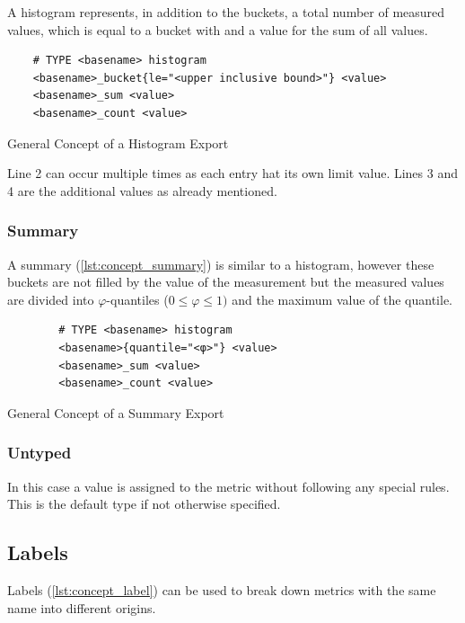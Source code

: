 A histogram represents, in addition to the buckets, a total number of measured values, which is equal to a bucket with  and a value for the sum of all values.

\begin{listing}[!ht]
	\begin{verbatim}
	# TYPE <basename> histogram
	<basename>_bucket{le="<upper inclusive bound>"} <value>
	<basename>_sum <value>
	<basename>_count <value>
	\end{verbatim}
	\caption{General Concept of a Histogram Export}
	\label{lst:concept_histogramm}
\end{listing}

Line 2 can occur multiple times as each entry hat its own limit value. Lines 3 and 4 are the additional values as already mentioned.

\subsubsection{Summary}

A summary (\cref{lst:concept_summary}) is similar to a histogram, however these buckets are not filled by the value of the measurement but the measured values are divided into $\varphi$-quantiles ($0 \le \varphi \le 1)$ and the maximum value of the quantile.

\begin{listing}[!ht]
	\begin{verbatim}
		# TYPE <basename> histogram
		<basename>{quantile="<φ>"} <value>
		<basename>_sum <value>
		<basename>_count <value>
	\end{verbatim}
	\caption{General Concept of a Summary Export}
	\label{lst:concept_summary}
\end{listing}

\subsubsection{Untyped}

In this case a value is assigned to the metric without following any special rules. This is the default type if not otherwise specified.

\subsection{Labels}

Labels (\cref{lst:concept_label}) can be used to break down metrics with the same name into different origins. 

